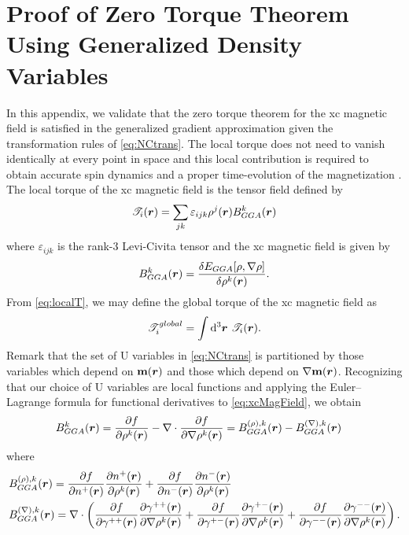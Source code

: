 \chapter{Proof of Zero Torque Theorem Using Generalized Density Variables} \label{apx:ZeroTorque}

In this appendix, we validate that the zero torque theorem for the xc magnetic field is satisfied in the generalized gradient approximation
given the transformation rules of \cref{eq:NCtrans}. 
The local torque does not need to vanish identically at every point in space and this local contribution is required to obtain accurate spin dynamics and a proper time-evolution of the magnetization \cite{Gyorffy01_206403,Gyorffy03_354,Frisch07_125119,Frisch12_2193,Scuseria13_035117,Li17_2591}.
The local torque of the xc magnetic field is the tensor field defined by \cite{Gyorffy01_206403}
\begin{equation}
\label{eq:localT}
\mathscr{T}_i(\boldsymbol{r}) = \sum_{jk} \varepsilon_{ijk} \rho^j(\boldsymbol{r}) B_{GGA}^k(\boldsymbol{r})
\end{equation}
where $\varepsilon_{ijk}$ is the rank-3 Levi-Civita tensor and the xc magnetic field is given by
\begin{equation}
\label{eq:xcMagField}
B_{GGA}^k(\boldsymbol{r}) = \frac{\delta E_{GGA}[\rho,\nabla\rho]}{\delta \rho^k(\boldsymbol{r})} .
\end{equation}
From \cref{eq:localT}, we may define the global torque of the xc magnetic field as
\begin{equation}
\mathscr{T}_i^{global} = \int \mathrm{d}^3 \boldsymbol{r} \text{ } \mathscr{T}_i(\boldsymbol{r}) .
\end{equation}
Remark that the set of U variables in \cref{eq:NCtrans} is partitioned by those variables which depend on
$\mathbf{m}(\boldsymbol{r})$ and those which depend on $\nabla\mathbf{m}(\boldsymbol{r})$. Recognizing that our choice of U variables
are local functions and
applying the Euler--Lagrange formula for functional derivatives to \cref{eq:xcMagField}, we obtain
\begin{align}
B_{GGA}^{k}(\boldsymbol{r}) &= \frac{\partial f}{\partial \rho^k(\boldsymbol{r})} - \nabla \cdot \frac{\partial f}{\partial \nabla \rho^k(\boldsymbol{r})}  = B^{(\rho),k}_{GGA}(\boldsymbol{r}) - B^{(\nabla),k}_{GGA}(\boldsymbol{r})
\end{align}
where
\begin{align}
&B^{(\rho),k}_{GGA}(\boldsymbol{r}) = \frac{\partial f}{\partial n^+(\boldsymbol{r})} \frac{\partial n^+(\boldsymbol{r})}{\partial \rho^k(\boldsymbol{r})} + 
  \frac{\partial f}{\partial n^-(\boldsymbol{r})} \frac{\partial n^-(\boldsymbol{r})}{\partial \rho^k(\boldsymbol{r})} \label{eq:BxcR}\\ 
&B^{(\nabla),k}_{GGA}(\boldsymbol{r})= \nabla \cdot 
  \left(
    \frac{\partial f}{\partial \gamma^{++}(\boldsymbol{r})}\frac{\partial \gamma^{++}(\boldsymbol{r})}{\partial \nabla \rho^k(\boldsymbol{r})} + 
    \frac{\partial f}{\partial \gamma^{+-}(\boldsymbol{r})}\frac{\partial \gamma^{+-}(\boldsymbol{r})}{\partial \nabla \rho^k(\boldsymbol{r})} + 
    \frac{\partial f}{\partial \gamma^{--}(\boldsymbol{r})}\frac{\partial \gamma^{--}(\boldsymbol{r})}{\partial \nabla \rho^k(\boldsymbol{r})}   
  \right) . \label{eq:BxcGR}
\end{align}
